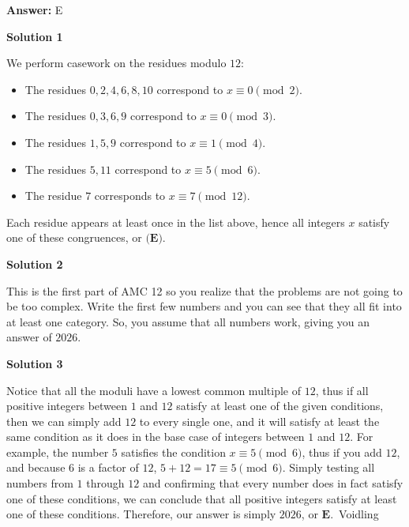 \begin{enumerate}
 \textbf{Answer: }E



\textbf{Solution 1}

We perform casework on the residues modulo $12$:

 
            \begin{itemize}
        \item The residues $0,2,4,6,8,10$ correspond to $x\equiv 0\pmod{2}$.
        \item The residues $0,3,6,9$ correspond to $x\equiv 0\pmod{3}$.
        \item The residues $1,5,9$ correspond to $x\equiv 1\pmod{4}$.
        \item The residues $5,11$ correspond to $x\equiv 5\pmod{6}$.
        \item The residue $7$ corresponds to $x\equiv 7\pmod{12}$.
            \end{itemize}
            Each residue appears at least once in the list above, hence all integers $x$ satisfy one of these congruences, or $\boxed{\textbf{(E)}}$.

 



\textbf{Solution 2}

This is the first part of AMC 12 so you realize that the problems are not going to be too complex. Write the first few numbers and you can see that they all fit into at least one category. So, you assume that all numbers work, giving you an answer of $\boxed{\text{2026}}$.

 



\textbf{Solution 3}

Notice that all the moduli have a lowest common multiple of $12$, thus if all positive integers between $1$ and $12$ satisfy at least one of the given conditions, then we can simply add $12$ to every single one, and it will satisfy at least the same condition as it does in the base case of integers between $1$ and $12$. For example, the number $5$ satisfies the condition $x \equiv 5 \pmod{6}$, thus if you add $12$, and because $6$ is a factor of $12$, $5+12=17 \equiv 5 \pmod{6}$. Simply testing all numbers from $1$ through $12$ and confirming that every number does in fact satisfy one of these conditions, we can conclude that all positive integers satisfy at least one of these conditions. Therefore, our answer is simply $2026$, or $\boxed{\textbf{E}}$.~Voidling

 



\end{enumerate}
